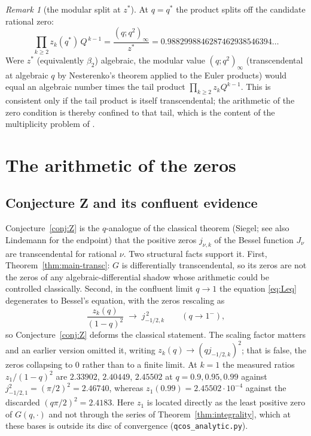 \documentclass[11pt]{article}
\theoremstyle{plain}
\theoremstyle{definition}
\theoremstyle{remark}
\newtheorem{remark}[theorem]{Remark}
\begin{document}
\begin{remark}[the modular split at $z^\ast$]
\label{rem:zeroproduct-dioph}
At $q=q^\ast$ the product splits off the candidate rational zero:
\[
   \prod_{k\ge2}z_k(q^\ast)\,Q^{\,k-1}=\frac{(q;q^2)_\infty}{z^\ast}
   =0.9882998846287462938546394\ldots
\]
Were $z^\ast$ (equivalently $\beta_2$) algebraic, the modular value $(q;q^2)_\infty$ (transcendental at algebraic $q$ by Nesterenko's theorem \cite{Nesterenko} applied to the Euler
products) would equal an algebraic number times the tail product $\prod_{k\ge2}z_kQ^{k-1}$. This is
consistent only if the tail product is itself transcendental; the arithmetic of the zero condition is
thereby confined to that tail, which is the content of the multiplicity problem of \cite{Bonfioli2}.
\end{remark}


\section{The arithmetic of the zeros}\label{sec:arith}

\subsection{Conjecture Z and its confluent evidence}
Conjecture~\ref{conj:Z} is the $q$-analogue of the classical theorem (Siegel; see also Lindemann for
the endpoint) that the positive zeros $j_{\nu,k}$ of the Bessel function $J_\nu$ are transcendental for
rational $\nu$. Two structural facts support it. First, Theorem~\ref{thm:main-transc}: $G$ is
differentially transcendental, so its zeros are not the zeros of any algebraic-differential shadow
whose arithmetic could be controlled classically. Second, in the confluent limit $q\to1$ the equation
\eqref{eq:Leq} degenerates to Bessel's equation, with the zeros rescaling as
\[
   \frac{z_k(q)}{(1-q)^2}\;\longrightarrow\;j_{-1/2,k}^{\,2}
   \qquad(q\to1^-),
\]
so Conjecture~\ref{conj:Z} deforms the classical statement. The scaling factor matters and an
earlier version omitted it, writing $z_k(q)\to(qj_{-1/2,k})^2$; that is false, the zeros collapsing
to $0$ rather than to a finite limit. At $k=1$ the measured ratios $z_1/(1-q)^2$ are
$2.33902$, $2.40449$, $2.45502$ at $q=0.9,0.95,0.99$ against $j_{-1/2,1}^2=(\pi/2)^2=2.46740$,
whereas $z_1(0.99)=2.45502\cdot10^{-4}$ against the discarded $(q\pi/2)^2=2.4183$. Here $z_1$ is
located directly as the least positive zero of $G(q,\cdot)$ and not through the series of
Theorem~\ref{thm:integrality}, which at these bases is outside its disc of convergence
(\texttt{qcos\_analytic.py}).
\end{document}
